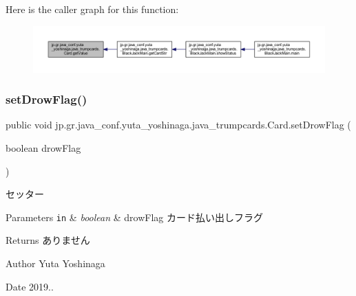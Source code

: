 Here is the caller graph for this function\+:
\nopagebreak
\begin{figure}[H]
\begin{center}
\leavevmode
\includegraphics[width=350pt]{classjp_1_1gr_1_1java__conf_1_1yuta__yoshinaga_1_1java__trumpcards_1_1_card_aebe71c344f7ef4d1f15d4d30d08898d0_icgraph}
\end{center}
\end{figure}
\mbox{\label{classjp_1_1gr_1_1java__conf_1_1yuta__yoshinaga_1_1java__trumpcards_1_1_card_a52e0de709fd788e13ad930562e8e4be2}} 
\subsubsection{\texorpdfstring{set\+Drow\+Flag()}{setDrowFlag()}}
{\footnotesize\ttfamily public void jp.\+gr.\+java\+\_\+conf.\+yuta\+\_\+yoshinaga.\+java\+\_\+trumpcards.\+Card.\+set\+Drow\+Flag (\begin{DoxyParamCaption}\item[{boolean}]{drow\+Flag }\end{DoxyParamCaption})}



セッター 


\begin{DoxyParams}[1]{Parameters}
\mbox{\tt in}  & {\em boolean} & drow\+Flag カード払い出しフラグ \\
\hline
\end{DoxyParams}
\begin{DoxyReturn}{Returns}
ありません 
\end{DoxyReturn}
\begin{DoxyAuthor}{Author}
Yuta Yoshinaga 
\end{DoxyAuthor}
\begin{DoxyDate}{Date}
2019.. 
\end{DoxyDate}


